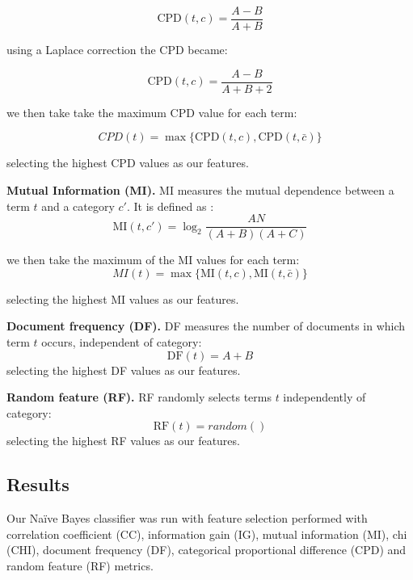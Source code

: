 \documentclass[10pt, a4paper]{article}
\begin{document}
$$\text{CPD}(t,c) = \frac{A-B}{A+B}$$

using a Laplace correction the CPD became:

$$\text{CPD}(t,c) = \frac{A-B}{A+B+2}$$

we then take take the maximum CPD value for each term:

$$CPD (t) = \max\{\text{CPD}(t,c),\text{CPD}(t,\bar{c})\} $$

selecting the highest CPD values as our features.

\textbf{Mutual Information (MI).} MI measures the mutual dependence between a term $t$ and a category $c'$. It is defined as \cite{CPD}:
$$ \text{MI}(t,c') = \log_2 \frac{AN}{(A+B)(A+C)} $$

we then take the maximum of the MI values for each term:
$$MI (t) = \max\{\text{MI}(t,c),\text{MI}(t,\bar{c})\} $$

selecting the highest MI values as our features.

\textbf{Document frequency (DF).} DF measures the number of documents in which term $t$ occurs, independent of category:
$$ \text{DF}(t) = A+B $$
selecting the highest DF values as our features.

\textbf{Random feature (RF).} RF randomly selects terms $t$ independently of category:
$$ \text{RF}(t) = random() $$
selecting the highest RF values as our features.

\subsection{Results}

Our Na\"ive Bayes classifier was run with feature selection performed with correlation coefficient (CC), information gain (IG), mutual information (MI), chi (CHI), document frequency (DF), categorical proportional difference (CPD) and random feature (RF) metrics.
\end{document}

